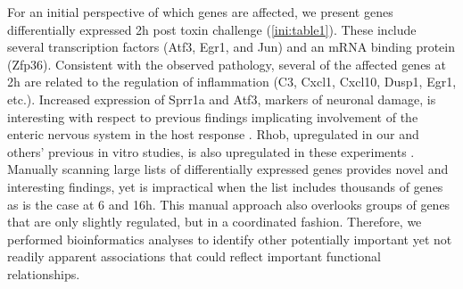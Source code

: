 For an initial perspective of which genes are affected, we present 
genes differentially expressed 2h post toxin challenge 
(\autoref{ini:table1}). These include several transcription factors 
(Atf3, Egr1, and Jun) and an mRNA binding protein (Zfp36). Consistent 
with the observed pathology, several of the affected genes at 2h are 
related to the regulation of inflammation (C3, Cxcl1, Cxcl10, Dusp1, 
Egr1, etc.). Increased expression of Sprr1a and Atf3, markers of 
neuronal damage, is interesting with respect to previous findings 
implicating involvement of the enteric nervous system in the host 
response \cite{Starkey:2009kn,Linhoff:2009dm}. Rhob, upregulated in 
our and others' previous in vitro studies, is also upregulated in 
these experiments \cite{DAuria:2012bd,Gerhard:2005dg}. Manually scanning 
large lists of differentially expressed genes provides novel and 
interesting findings, yet is impractical when the list includes 
thousands of genes as is the case at 6 and 16h. This manual approach 
also overlooks groups of genes that are only slightly regulated, 
but in a coordinated fashion. Therefore, we performed bioinformatics 
analyses to identify other potentially important yet not readily 
apparent associations that could reflect important functional relationships.

